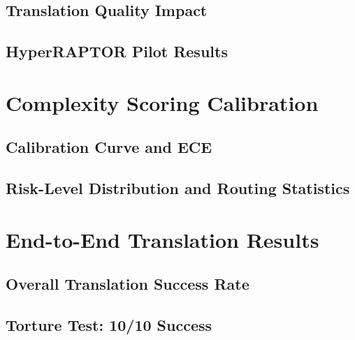 \documentclass[12pt,a4paper]{report}
\begin{document}
  \subsection{Translation Quality Impact}
  \label{subsec:raptor-translation-impact}

  \subsection{HyperRAPTOR Pilot Results}
  \label{subsec:hyperraptor-results}

\section{Complexity Scoring Calibration}
\label{sec:complexity-results}

  \subsection{Calibration Curve and ECE}
  \label{subsec:ece-results}

  \subsection{Risk-Level Distribution and Routing Statistics}
  \label{subsec:risk-distribution}

\section{End-to-End Translation Results}
\label{sec:translation-results}

  \subsection{Overall Translation Success Rate}
  \label{subsec:overall-success}

  \subsection{Torture Test: 10/10 Success}
  \label{subsec:torture-test-results}
\end{document}
